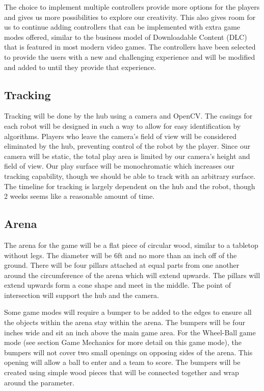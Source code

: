 \documentclass[11pt]{ieeeconf}
\begin{document}
The choice to implement multiple controllers provide more options for the players and gives us more possibilities to explore our creativity. This also gives room for us to continue adding controllers that can be implemented with extra game modes offered, similar to the business model of Downloadable Content (DLC) that is featured in most modern video games. The controllers have been selected to provide the users with a new and challenging experience and will be modified and added to until they provide that experience. 

\subsection{Tracking}

Tracking will be done by the hub using a camera and OpenCV. The casings for each robot will be designed in such a way to allow for easy identification by algorithms. Players who leave the camera's field of view will be considered eliminated by the hub, preventing control of the robot by the player. Since our camera will be static, the total play area is limited by our camera's height and field of view. Our play surface will be monochromatic which increases our tracking capability, though we should be able to track with an arbitrary surface. The timeline for tracking is largely dependent on the hub and the robot, though 2 weeks seems like a reasonable amount of time.

\subsection{Arena}

The arena for the game will be a flat piece of circular wood, similar to a tabletop without legs. The diameter will be 6ft and no more than an inch off of the ground. There will be four pillars attached at equal parts from one another around the circumference of the arena which will extend upwards. The pillars will extend upwards form a cone shape and meet in the middle. The point of intersection will support the hub and the camera. 

Some game modes will require a bumper to be added to the edges to ensure all the objects within the arena stay within the arena. The bumpers will be four inches wide and sit an inch above the main game area. For the Wheel-Ball game mode (see section Game Mechanics for more detail on this game mode), the bumpers will not cover two small openings on opposing sides of the arena. This opening will allow a ball to enter and a team to score. The bumpers will be created using simple wood pieces that will be connected together and wrap around the parameter. 
\end{document}
